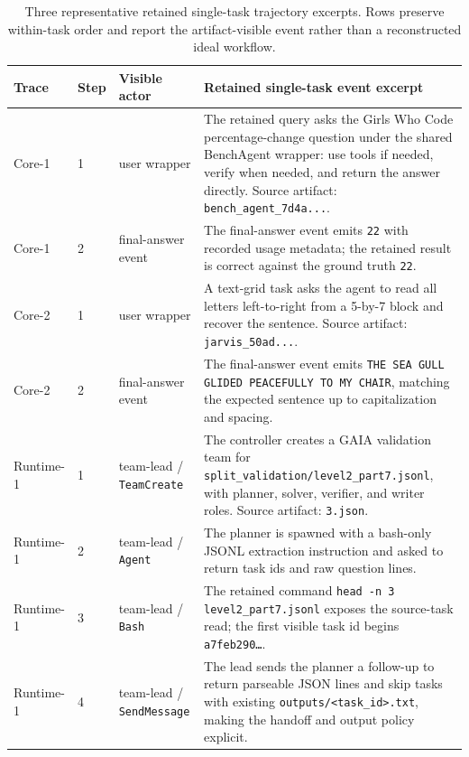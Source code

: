 \begin{table}[t]
    \centering
    \caption{Three representative retained single-task trajectory excerpts. Rows preserve within-task order and report the artifact-visible event rather than a reconstructed ideal workflow.}
    \label{tab:appendix_retained_trajectory_excerpt}
    \footnotesize
    \setlength{\tabcolsep}{3pt}
    \renewcommand{\arraystretch}{1.08}
    \begin{tabular}{p{}p{}p{}p{}}
        \toprule
        \textbf{Trace} & \textbf{Step} & \textbf{Visible actor} & \textbf{Retained single-task event excerpt} \\
        \midrule
        Core-1 & 1 & user wrapper & The retained query asks the Girls Who Code percentage-change question under the shared BenchAgent wrapper: use tools if needed, verify when needed, and return the answer directly. Source artifact: \texttt{bench\_agent\_7d4a...}. \\
        Core-1 & 2 & final-answer event & The final-answer event emits \texttt{22} with recorded usage metadata; the retained result is correct against the ground truth \texttt{22}. \\
        Core-2 & 1 & user wrapper & A text-grid task asks the agent to read all letters left-to-right from a 5-by-7 block and recover the sentence. Source artifact: \texttt{jarvis\_50ad...}. \\
        Core-2 & 2 & final-answer event & The final-answer event emits \texttt{THE SEA GULL GLIDED PEACEFULLY TO MY CHAIR}, matching the expected sentence up to capitalization and spacing. \\
        Runtime-1 & 1 & team-lead / \texttt{TeamCreate} & The controller creates a GAIA validation team for \texttt{split\_validation/level2\_part7.jsonl}, with planner, solver, verifier, and writer roles. Source artifact: \texttt{3.json}. \\
        Runtime-1 & 2 & team-lead / \texttt{Agent} & The planner is spawned with a bash-only JSONL extraction instruction and asked to return task ids and raw question lines. \\
        Runtime-1 & 3 & team-lead / \texttt{Bash} & The retained command \texttt{head -n 3 level2\_part7.jsonl} exposes the source-task read; the first visible task id begins \texttt{a7feb290{\ldots}}. \\
        Runtime-1 & 4 & team-lead / \texttt{SendMessage} & The lead sends the planner a follow-up to return parseable JSON lines and skip tasks with existing \texttt{outputs/<task\_id>.txt}, making the handoff and output policy explicit. \\
        \bottomrule
    \end{tabular}
    \renewcommand{\arraystretch}{1.0}
\end{table}

